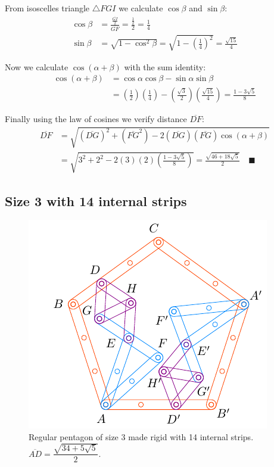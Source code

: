 \documentclass[11pt]{article}
\begin{document}
From isoscelles triangle $\triangle{FGI}$ we calculate $\cos\beta$ and $\sin\beta$:
\begin{align}
\cos\beta &= \frac{\frac{\overline{GI}}2}{\overline{GF}} = \frac{\frac{1}2}{2} = \frac{1}4\\
\sin\beta &= \sqrt{1 - \cos^2\beta} = \sqrt{1 - \left(\frac{1}4\right)^2} = \frac{\sqrt{15}}4
\end{align}

Now we calculate $\cos(\alpha+\beta)$ with the sum identity:
\begin{align}
\cos(\alpha+\beta) &= \cos\alpha\cos\beta - \sin\alpha\sin\beta \nonumber\\
 &= \left(\frac{1}2\right)\left(\frac{1}4\right)
  -\left(\frac{\sqrt3}2\right)\left(\frac{\sqrt{15}}4\right)
 = \frac{1 - 3\sqrt5}8
\end{align}

Finally using the law of cosines we verify distance $\overline{DF}$:
\begin{align}
\overline{DF} &= \sqrt{(\overline{DG})^2 + (\overline{FG}^2)
 - 2(\overline{DG})(\overline{FG})\cos(\alpha+\beta)} \nonumber\\
 &= \sqrt{3^2 + 2^2 - 2(3)(2)\left(\frac{1 - 3\sqrt5}8\right)}
 = \frac{\sqrt{46+18\sqrt5}}2 \quad\blacksquare
\end{align}

\subsection{Size 3 with 14 internal strips}

\begin{figure}[H]
\centering
\includegraphics[scale=1.2]{3/penta3-14a}
\caption{Regular pentagon of size 3 made rigid with 14 internal strips. $\overline{AD} = \dfrac{\sqrt{34+5\sqrt5}}2$.}
\label{fig:penta3-14a}
\end{figure}
\end{document}
